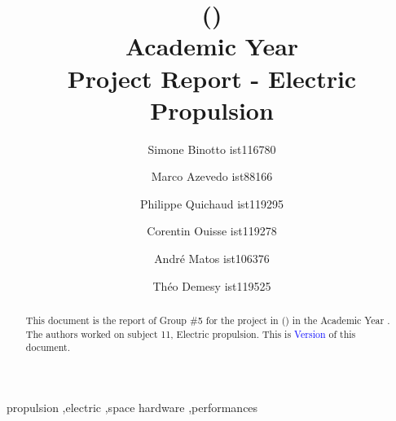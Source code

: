 \documentclass[3p,preprint,12pt]{elsarticle}	%
\theoremstyle{definition}		%
\begin{document}
\begin{frontmatter}

\title{{\Large \CourseNamePt {} (\YearDegree )}\\
{\large Academic Year \AcademYear}\vspace{.5cm}\\
Project Report - Electric Propulsion
}


\author[LEA-ist-address]{Simone Binotto ist116780}

\author[LEA-ist-address]{Marco Azevedo ist88166}

\author[LEA-ist-address]{Philippe Quichaud ist119295}

\author[LEA-ist-address]{Corentin Ouisse ist119278}

\author[LEA-ist-address]{Andr\'{e} Matos ist106376}

\author[LEA-ist-address]{Th\'{e}o Demesy ist119525}

\address[LEA-ist-address]{LEAer, Instituto Superior T\'{e}cnico, Universidade de Lisboa, Av. Rovisco Pais, 1049-001 Lisboa, Portugal}


\begin{abstract}
	This document is the report of Group \#\num{5} for the project in \emph{\CourseNamePt} (\CourseNameEng) in the Academic Year \AcademYear. The authors worked on subject 11, Electric propulsion. This is \textcolor{blue}{Version \VersionDoc} of this document.
\end{abstract}

\begin{keyword}
propulsion \sep electric \sep space hardware \sep performances
\end{keyword}



\end{frontmatter}



%
\end{document}
